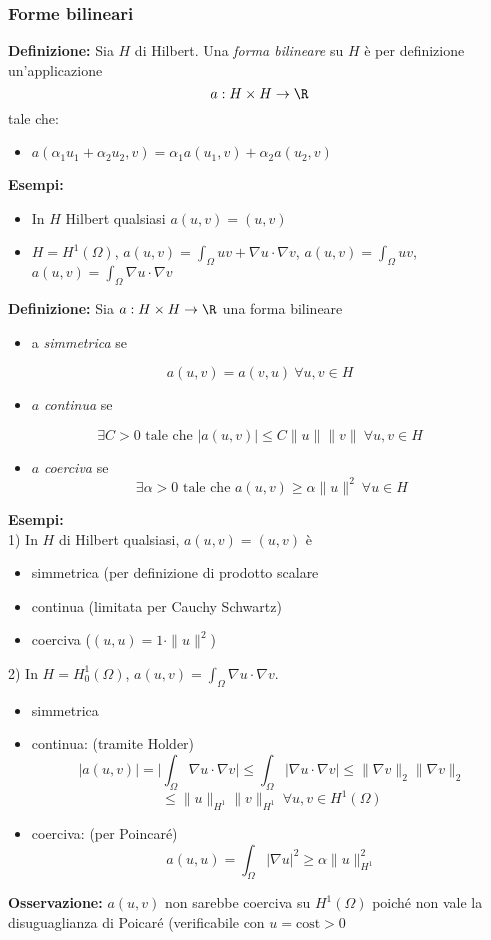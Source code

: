 \subsubsection{Forme bilineari}
\begin{tcolorbox}
\textbf{Definizione: }Sia $H$ di Hilbert. Una \emph{forma bilineare} su $H$ è per definizione un'applicazione 
\[a:H\times H\to \R\]
tale che:
\begin{itemize}
	\item $a(\alpha_1u_1+\alpha_2u_2,v)=\alpha_1a(u_1,v)+\alpha_2a(u_2,v)$
\end{itemize}
\end{tcolorbox}
\textbf{Esempi:} 
\begin{itemize}
	\item In $H$ Hilbert qualsiasi $a(u,v)=(u,v)$ 
	\item $H=H^1(\Omega)$, $a(u,v)=\int_{\Omega}^{} uv+\nabla u\cdot \nabla v $, $a(u,v)=\int_{\Omega}^{} uv $, $a(u,v)=\int_{\Omega}^{}  \nabla u\cdot \nabla v$

\end{itemize}
\begin{tcolorbox}
\textbf{Definizione: }Sia $a:H\times H\to \R$ una forma bilineare
\begin{itemize}
	\item a \emph{simmetrica} se
\end{itemize}
\[a(u,v)=a(v,u)\ \forall u,v\in H\]
\begin{itemize}
	\item $a$ \emph{continua} se
\end{itemize}
\[\exists C>0 \text{ tale che }|a(u,v)|\le C\|u\|\|v\|\ \forall u,v\in H\]
\begin{itemize}
\item $a$ \emph{coerciva} se 
	\[\exists \alpha>0\text{ tale che }a(u,v)\ge \alpha \|u\|^2\ \forall u\in H\]
\end{itemize}

\end{tcolorbox}
\textbf{Esempi:} 
\\1) In $H$ di Hilbert qualsiasi, $a(u,v)=(u,v)$ è
\begin{itemize}
	\item simmetrica (per definizione di prodotto scalare
	\item continua (limitata per Cauchy Schwartz)
	\item coerciva ($(u,u)=1\cdot \|u\|^2$)
\end{itemize}
2) In $H=H_0^1(\Omega)$, $a(u,v)=\int_{\Omega}^{} \nabla u\cdot \nabla v $.
\begin{itemize}
	\item simmetrica
	\item continua: (tramite Holder)
		\[|a(u,v)|=\bigg|\int_{\Omega}^{} \nabla u\cdot \nabla v\bigg|\le \int_{\Omega}^{} |\nabla u\cdot \nabla v|\le \|\nabla v\|_2\|\nabla v\|_2\]
		\[\le \|u\|_{H^1}\|v\|_{H^1}\ \forall u,v\in H^1(\Omega)\]
	\item coerciva: (per Poincaré)
		\[a(u,u)=\int_{\Omega}^{} |\nabla u|^2\ge \alpha \|u\|^2_{H^1}\] 
\end{itemize}
\textbf{Osservazione:} $a(u,v)$ non sarebbe coerciva su $H^1(\Omega)$ poiché non vale la disuguaglianza di Poicaré (verificabile con $u=\text{cost}> 0$ 
